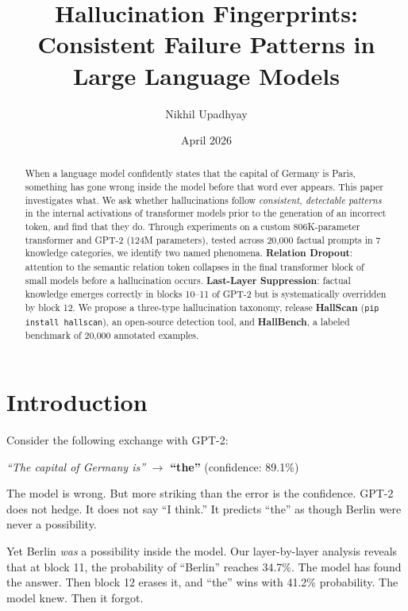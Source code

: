 \documentclass[11pt,a4paper]{article}
\title{\textbf{Hallucination Fingerprints: Consistent Failure
Patterns in Large Language Models}}
\author[1]{Nikhil Upadhyay}
\affil[1]{Independent Researcher, Dublin, Ireland \\
\texttt{nikhil25000@gmail.com}}
\date{April 2026}
\begin{document}
\maketitle

\begin{abstract}
When a language model confidently states that the capital of
Germany is Paris, something has gone wrong inside the model
before that word ever appears. This paper investigates what.
We ask whether hallucinations follow \emph{consistent, detectable
patterns} in the internal activations of transformer models
prior to the generation of an incorrect token, and find
that they do. Through experiments on a custom 806K-parameter
transformer and GPT-2 (124M parameters), tested across 20,000
factual prompts in 7 knowledge categories, we identify two named
phenomena. \textbf{Relation Dropout}: attention to the semantic
relation token collapses in the final transformer block of small
models before a hallucination occurs.
\textbf{Last-Layer Suppression}: factual knowledge emerges
correctly in blocks 10--11 of GPT-2 but is systematically
overridden by block 12.
We propose a three-type hallucination taxonomy, release
\textbf{HallScan} (\texttt{pip install hallscan}), an
open-source detection tool, and \textbf{HallBench}, a labeled
benchmark of 20,000 annotated examples.
\end{abstract}

\section{Introduction}

Consider the following exchange with GPT-2:

\begin{center}
\textit{``The capital of Germany is''} $\rightarrow$
\textbf{``the''} \quad (confidence: 89.1\%)
\end{center}

The model is wrong. But more striking than the error is the
confidence. GPT-2 does not hedge. It does not say ``I think.''
It predicts ``the'' as though Berlin were never a possibility.

Yet Berlin \emph{was} a possibility inside the model.
Our layer-by-layer analysis reveals that at block 11,
the probability of ``Berlin'' reaches 34.7\%. The model
has found the answer. Then block 12 erases it, and ``the''
wins with 41.2\% probability. The model knew. Then it forgot.
\end{document}
